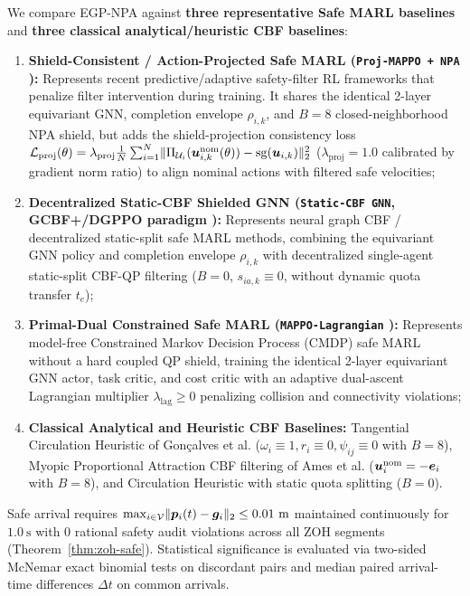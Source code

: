 We compare EGP-NPA against \textbf{three representative Safe MARL baselines} and \textbf{three classical analytical/heuristic CBF baselines}:
\begin{enumerate}
 \item \textbf{Shield-Consistent / Action-Projected Safe MARL (\texttt{Proj-MAPPO + NPA} \cite{wabersich2021,liu2026saferl}):} Represents recent predictive/adaptive safety-filter RL frameworks that penalize filter intervention during training. It shares the identical 2-layer equivariant GNN, completion envelope $\rho_{i,k}$, and $B=8$ closed-neighborhood NPA shield, but adds the shield-projection consistency loss $\mathcal L_{\mathrm{proj}}(\theta)=\lambda_{\mathrm{proj}}\frac1N\sum_{i=1}^N\lVert\Pi_{\mathcal U_i}(\boldsymbol{u}_{i,k}^{\mathrm{nom}}(\theta))-\operatorname{sg}(\boldsymbol{u}_{i,k})\rVert_2^2$ ($\lambda_{\mathrm{proj}}=1.0$ calibrated by gradient norm ratio) to align nominal actions with filtered safe velocities;
 \item \textbf{Decentralized Static-CBF Shielded GNN (\texttt{Static-CBF GNN}, GCBF+/DGPPO paradigm \cite{zhang2025gcbf,zhang2025dgppo}):} Represents neural graph CBF / decentralized static-split safe MARL methods, combining the equivariant GNN policy and completion envelope $\rho_{i,k}$ with decentralized single-agent static-split CBF-QP filtering ($B=0$, $s_{ia,k}\equiv 0$, without dynamic quota transfer $t_e$);
 \item \textbf{Primal-Dual Constrained Safe MARL (\texttt{MAPPO-Lagrangian} \cite{gu2023safe}):} Represents model-free Constrained Markov Decision Process (CMDP) safe MARL without a hard coupled QP shield, training the identical 2-layer equivariant GNN actor, task critic, and cost critic with an adaptive dual-ascent Lagrangian multiplier $\lambda_{\mathrm{lag}}\ge 0$ penalizing collision and connectivity violations;
 \item \textbf{Classical Analytical and Heuristic CBF Baselines:} Tangential Circulation Heuristic of Gon\c{c}alves et al. \cite{goncalves2023circulation} ($\omega_i\equiv 1,r_i\equiv 0,\psi_{ij}\equiv 0$ with $B=8$), Myopic Proportional Attraction CBF filtering of Ames et al. \cite{ames2017cbf,reis2021} ($\boldsymbol{u}_i^{\mathrm{nom}}=-\boldsymbol{e}_i$ with $B=8$), and Circulation Heuristic with static quota splitting ($B=0$).
\end{enumerate}
Safe arrival requires $\max_{i\in\mathcal V}\lVert\boldsymbol{p}_i(t)-\boldsymbol{g}_i\rVert_2\le 0.01\ \mathrm m$ maintained continuously for $1.0\ \mathrm s$ with $0$ rational safety audit violations across all ZOH segments (Theorem~\ref{thm:zoh-safe}). Statistical significance is evaluated via two-sided McNemar exact binomial tests on discordant pairs and median paired arrival-time differences $\Delta t$ on common arrivals.

